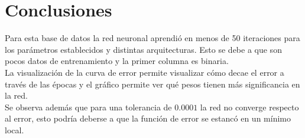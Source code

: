 \documentclass[12pt,letterpaper]{article}
\theoremstyle{definition}
\theoremstyle{definition}
\theoremstyle{definition}
\theoremstyle{definition}
\theoremstyle{definition}
\theoremstyle{definition}
\begin{document}
\section{Conclusiones}
Para esta base de datos la red neuronal aprendió en menos de 50 iteraciones para los parámetros establecidos y distintas arquitecturas. Esto se debe a que son pocos datos de entrenamiento y la primer columna es binaria.\\
La visualización de la curva de error permite visualizar cómo decae el error a través de las épocas y el gráfico permite ver qué pesos tienen más significancia en la red.\\
Se observa además que para una tolerancia de $ 0.0001 $ la red no converge respecto al error, esto podría deberse a que la función de error se estancó en un mínimo local.
\end{document}
